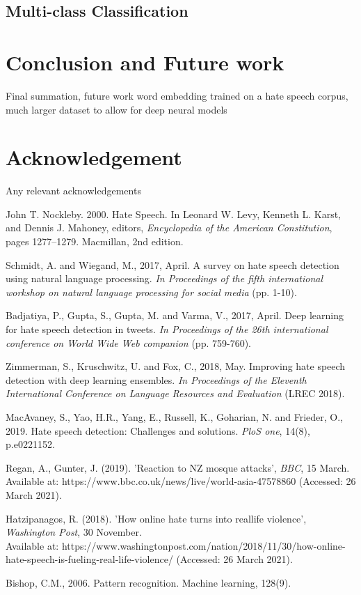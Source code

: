 \documentclass[conference]{IEEEtran}
\begin{document}
\subsection{Multi-class Classification}

\section{Conclusion and Future work}
Final summation, future work word embedding trained on a hate speech corpus, much larger dataset to allow for deep neural models

\section*{Acknowledgement}

Any relevant acknowledgements

\begin{thebibliography}{00}
 John T. Nockleby. 2000. Hate Speech. In Leonard W.
Levy, Kenneth L. Karst, and Dennis J. Mahoney,
editors, \textit{Encyclopedia of the American Constitution},
pages 1277–1279. Macmillan, 2nd edition.

 Schmidt, A. and Wiegand, M., 2017, April. A survey on hate speech detection using natural language processing. \textit{In Proceedings of the fifth international workshop on natural language processing for social media} (pp. 1-10).

 Badjatiya, P., Gupta, S., Gupta, M. and Varma, V., 2017, April. Deep learning for hate speech detection in tweets. \textit{In Proceedings of the 26th international conference on World Wide Web companion} (pp. 759-760).

 Zimmerman, S., Kruschwitz, U. and Fox, C., 2018, May. Improving hate speech detection with deep learning ensembles. \textit{In Proceedings of the Eleventh International Conference on Language Resources and Evaluation} (LREC 2018).

 MacAvaney, S., Yao, H.R., Yang, E., Russell, K., Goharian, N. and Frieder, O., 2019. Hate speech detection: Challenges and solutions. \textit{PloS one}, 14(8), p.e0221152.

 Regan, A., Gunter, J. (2019). 'Reaction to NZ mosque attacks', \textit{BBC}, 15 March. Available at: https://www.bbc.co.uk/news/live/world-asia-47578860 (Accessed: 26 March 2021).

 Hatzipanagos, R. (2018). 'How online hate turns into reallife violence', \textit{Washington Post}, 30 November. \\ Available at: https://www.washingtonpost.com/nation/2018/11/30/how-online-hate-speech-is-fueling-real-life-violence/ (Accessed: 26 March 2021).

 Bishop, C.M., 2006. Pattern recognition. Machine learning, 128(9).
\end{thebibliography}
\vspace{12pt}
\end{document}

